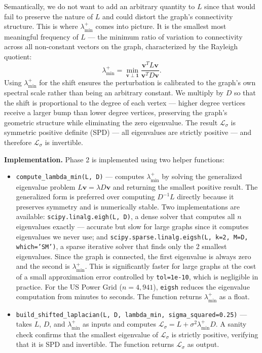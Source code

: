 \documentclass[a4paper,12pt]{amsart}
\numberwithin{equation}{section}
\def\bv{{\mathbf v}}
\renewcommand{\L}{{\mathcal L}}
\def\bone{{\boldsymbol 1}}
\begin{document}
Semantically, we do not want to add an arbitrary quantity to $L$ since that 
would fail to preserve the nature of $L$ and could distort the graph's 
connectivity structure. This is where $\lambda^+_{\min}$ comes into picture. 
It is the smallest most meaningful frequency of $L$ — the minimum ratio of 
variation to connectivity across all non-constant vectors on the graph, 
characterized by the Rayleigh quotient:
\begin{equation*}
\lambda^+_{\min} = \min_{\bv \perp \bone} \frac{\bv^T L \bv}{\bv^T D \bv}.
\end{equation*}
Using $\lambda^+_{\min}$ for the shift ensures the perturbation is calibrated 
to the graph's own spectral scale rather than being an arbitrary constant. 
We multiply by $D$ so that the shift is proportional to the degree of each 
vertex — higher degree vertices receive a larger bump than lower degree 
vertices, preserving the graph's geometric structure while eliminating the 
zero eigenvalue. The result $\L_\sigma$ is symmetric positive 
definite (SPD) — all eigenvalues are strictly positive — and therefore $\L_\sigma$ is
invertible.


\textbf{Implementation.} Phase 2 is implemented using two helper functions:

\begin{itemize}[noitemsep, topsep=4pt, leftmargin=3em]

\item \texttt{compute\_lambda\_min(L, D)} — computes $\lambda^+_{\min}$ 
by solving the generalized eigenvalue problem $L\bv = \lambda D\bv$ and 
returning the smallest positive result. The generalized form is preferred 
over computing $D^{-1}L$ directly because it preserves symmetry and is 
numerically stable. Two implementations are available: \texttt{scipy.linalg.eigh(L, D)}, 
a dense solver that computes all $n$ eigenvalues exactly — accurate but 
slow for large graphs since it computes eigenvalues we never use; and 
\texttt{scipy.sparse.linalg.eigsh(L, k=2, M=D, which='SM')}, a sparse 
iterative solver that finds only the 2 smallest eigenvalues. Since the 
graph is connected, the first eigenvalue is always zero and the second 
is $\lambda^+_{\min}$. This is significantly faster for large graphs at 
the cost of a small approximation error controlled by \texttt{tol=1e-10}, 
which is negligible in practice. For the US Power Grid ($n = 4{,}941$), 
\texttt{eigsh} reduces the eigenvalue computation from minutes to seconds. 
The function returns $\lambda^+_{\min}$ as a float.

\item \texttt{build\_shifted\_laplacian(L, D, lambda\_min, sigma\_squared=0.25)}
— takes $L$, $D$, and $\lambda^+_{\min}$ as inputs and computes 
$\L_\sigma = L + \sigma^2 \lambda^+_{\min} D$. A sanity check 
confirms that the smallest eigenvalue of $\L_\sigma$ is strictly 
positive, verifying that it is SPD and invertible. The function returns 
$\L_\sigma$ as output.

\end{itemize}
\end{document}
